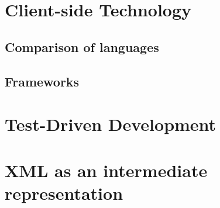 \section{Client-side Technology}


\subsection{Comparison of languages}
\subsection{Frameworks}

\section{Test-Driven Development}
\section{XML as an intermediate representation}



